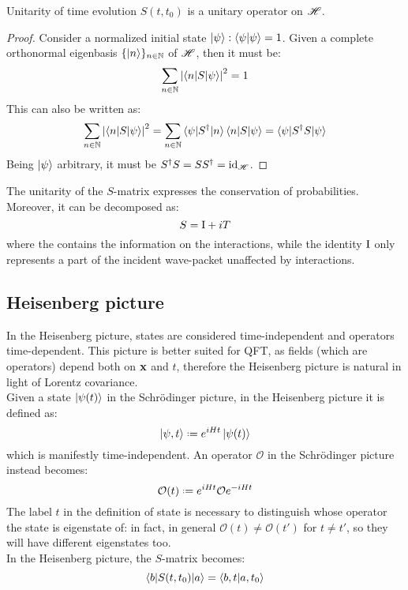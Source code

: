 \begin{proposition}{Unitarity of time evolution}{}
  $ S(t,t_0) $ is a unitary operator on $ \mathscr{H} $.
\end{proposition}

\begin{proofbox}
  \begin{proof}
    Consider a normalized initial state $ \ket{\psi} : \braket{\psi | \psi} = 1 $. Given a complete orthonormal eigenbasis $ \{\ket{n}\}_{n \in \mathbb{N}} $ of $ \mathscr{H} $, then it must be:
    \begin{equation}
      \sum_{n \in \mathbb{N}} \left\lvert\braket{n | S | \psi}\right\rvert^2 = 1
    \end{equation}
    This can also be written as:
    \begin{equation}
      \sum_{n \in \mathbb{N}} \left\lvert\braket{n | S | \psi}\right\rvert^2 = \sum_{n \in \mathbb{N}} \braket{\psi | S^\dagger | n} \braket{n | S | \psi} = \braket{\psi | S^\dagger S | \psi}
    \end{equation}
    Being $ \ket{\psi} $ arbitrary, it must be $ S^\dagger S = S S^\dagger = \operatorname{id}_{\mathscr{H}} $.
  \end{proof}
\end{proofbox}

The unitarity of the $ S $-matrix expresses the conservation of probabilities. Moreover, it can be decomposed as:
\begin{equation}
  S = \mathrm{I} + i T
\end{equation}
where the  contains the information on the interactions, while the identity $ \mathrm{I} $ only represents a part of the incident wave-packet unaffected by interactions.

\subsection{Heisenberg picture}

In the Heisenberg picture, states are considered time-independent and operators time-dependent. This picture is better suited for QFT, as fields (which are operators) depend both on $ \mathbf{x} $ and $ t $, therefore the Heisenberg picture is natural in light of Lorentz covariance. \\
Given a state $ \ket{\psi(t)} $ in the Schrödinger picture, in the Heisenberg picture it is defined as:
\begin{equation}
  \ket{\psi,t} \defeq e^{i H t} \ket{\psi(t)}
\end{equation}
which is manifestly time-independent. An operator $ \mathcal{O} $ in the Schrödinger picture instead becomes:
\begin{equation}
  \mathcal{O}(t) \defeq e^{i H t} \mathcal{O} e^{-i H t}
\end{equation}
The label $ t $ in the definition of state is necessary to distinguish whose operator the state is eigenstate of: in fact, in general $ \mathcal{O}(t) \neq \mathcal{O}(t') $ for $ t \neq t' $, so they will have different eigenstates too. \\
In the Heisenberg picture, the $ S $-matrix becomes:
\begin{equation}
  \braket{b | S(t,t_0) | a} = \braket{b,t | a,t_0}
\end{equation}


